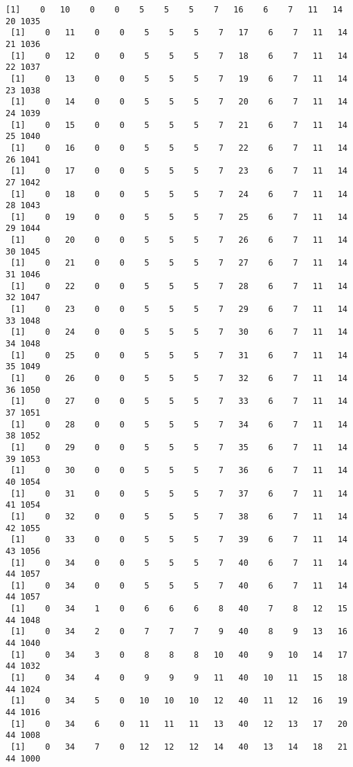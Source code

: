 \documentclass[11pt]{article}
\begin{document}
\begin{Verbatim}[commandchars=\\\{\}]
 [1]    0   10    0    0    5    5    5    7   16    6    7   11   14   20 1035
 [1]    0   11    0    0    5    5    5    7   17    6    7   11   14   21 1036
 [1]    0   12    0    0    5    5    5    7   18    6    7   11   14   22 1037
 [1]    0   13    0    0    5    5    5    7   19    6    7   11   14   23 1038
 [1]    0   14    0    0    5    5    5    7   20    6    7   11   14   24 1039
 [1]    0   15    0    0    5    5    5    7   21    6    7   11   14   25 1040
 [1]    0   16    0    0    5    5    5    7   22    6    7   11   14   26 1041
 [1]    0   17    0    0    5    5    5    7   23    6    7   11   14   27 1042
 [1]    0   18    0    0    5    5    5    7   24    6    7   11   14   28 1043
 [1]    0   19    0    0    5    5    5    7   25    6    7   11   14   29 1044
 [1]    0   20    0    0    5    5    5    7   26    6    7   11   14   30 1045
 [1]    0   21    0    0    5    5    5    7   27    6    7   11   14   31 1046
 [1]    0   22    0    0    5    5    5    7   28    6    7   11   14   32 1047
 [1]    0   23    0    0    5    5    5    7   29    6    7   11   14   33 1048
 [1]    0   24    0    0    5    5    5    7   30    6    7   11   14   34 1048
 [1]    0   25    0    0    5    5    5    7   31    6    7   11   14   35 1049
 [1]    0   26    0    0    5    5    5    7   32    6    7   11   14   36 1050
 [1]    0   27    0    0    5    5    5    7   33    6    7   11   14   37 1051
 [1]    0   28    0    0    5    5    5    7   34    6    7   11   14   38 1052
 [1]    0   29    0    0    5    5    5    7   35    6    7   11   14   39 1053
 [1]    0   30    0    0    5    5    5    7   36    6    7   11   14   40 1054
 [1]    0   31    0    0    5    5    5    7   37    6    7   11   14   41 1054
 [1]    0   32    0    0    5    5    5    7   38    6    7   11   14   42 1055
 [1]    0   33    0    0    5    5    5    7   39    6    7   11   14   43 1056
 [1]    0   34    0    0    5    5    5    7   40    6    7   11   14   44 1057
 [1]    0   34    0    0    5    5    5    7   40    6    7   11   14   44 1057
 [1]    0   34    1    0    6    6    6    8   40    7    8   12   15   44 1048
 [1]    0   34    2    0    7    7    7    9   40    8    9   13   16   44 1040
 [1]    0   34    3    0    8    8    8   10   40    9   10   14   17   44 1032
 [1]    0   34    4    0    9    9    9   11   40   10   11   15   18   44 1024
 [1]    0   34    5    0   10   10   10   12   40   11   12   16   19   44 1016
 [1]    0   34    6    0   11   11   11   13   40   12   13   17   20   44 1008
 [1]    0   34    7    0   12   12   12   14   40   13   14   18   21   44 1000

\end{Verbatim}
\end{document}

